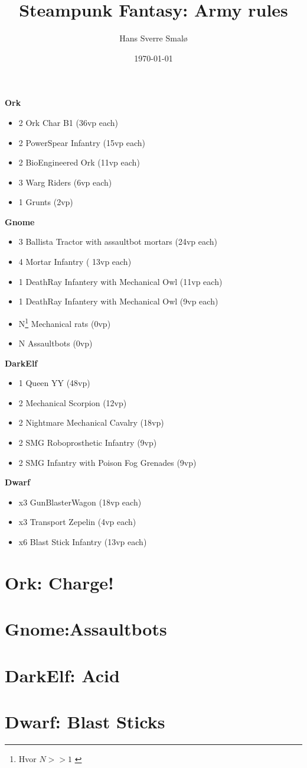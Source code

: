 \documentclass[a4,12pt, color, hyperref]{book}
\title{Steampunk Fantasy: Army rules}
\author{Hans Sverre Smalø}
\date{\today}
\begin{document}
\maketitle
\setcounter{tocdepth}{1}
\tableofcontents

\clearpage

{\bf Ork}
\begin{itemize}
\item 2 Ork Char B1 (36vp each)
\item 2 PowerSpear Infantry (15vp each)
\item 2 BioEngineered Ork (11vp each)
\item 3 Warg Riders (6vp each)  
\item 1 Grunts (2vp)  
\end{itemize}  


{\bf Gnome}
\begin{itemize}
\item 3 Ballista Tractor with assaultbot mortars (24vp each)
\item 4 Mortar Infantry ( 13vp each)
\item 1 DeathRay Infantery with Mechanical Owl (11vp each)
\item 1 DeathRay Infantery with Mechanical Owl (9vp each)
\item N\footnote{Hvor $N >> 1$ \label{large}} Mechanical rats (0vp)
\item N Assaultbots (0vp)  
\end{itemize}  

{\bf DarkElf}
\begin{itemize}  
\item 1 Queen YY (48vp)
\item 2 Mechanical Scorpion (12vp)
\item 2 Nightmare Mechanical Cavalry (18vp)
\item 2 SMG Roboprosthetic Infantry (9vp)
\item 2 SMG Infantry with Poison Fog Grenades (9vp)
\end{itemize}  


{\bf Dwarf}
\begin{itemize}
\item x3 GunBlasterWagon (18vp each)
\item x3 Transport Zepelin (4vp each)
\item x6 Blast Stick Infantry (13vp each)
\end{itemize}


\chapter{Ork: Charge!}


\chapter{Gnome:Assaultbots}


\chapter{DarkElf: Acid}


\chapter{Dwarf: Blast Sticks}

\end{document}
